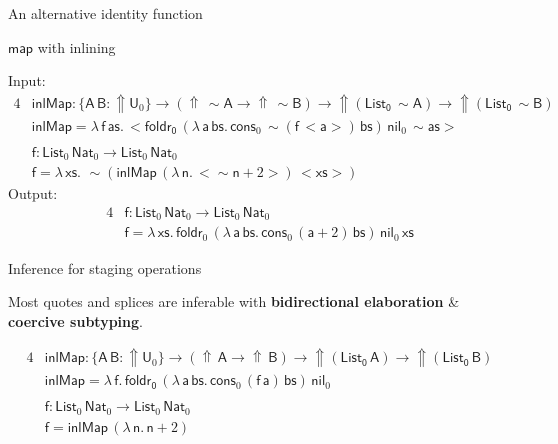 \documentclass[dvipsnames,aspectratio=169]{beamer}
\newcommand{\msf}[1]{\mathsf{#1}}
\newcommand{\Lift}{{\Uparrow}}
\newcommand{\spl}{{\sim}}
\newcommand{\qut}[1]{{<}#1{>}}
\newcommand{\U}{\msf{U}}
\newcommand{\List}{\msf{List}}
\newcommand{\nil}{\msf{nil}}
\newcommand{\cons}{\msf{cons}}
\newcommand{\Nat}{\msf{Nat}}
\theoremstyle{remark}
\newcommand{\msA}{\msf{A}}
\newcommand{\msB}{\msf{B}}
\newcommand{\msas}{\msf{as}}
\newcommand{\msbs}{\msf{bs}}
\newcommand{\msxs}{\msf{xs}}
\newcommand{\msff}{\msf{f}}
\newcommand{\msa}{\msf{a}}
\begin{document}
\begin{frame}{An alternative identity function}
\end{frame}


\begin{frame}{$\msf{map}$ with inlining}

Input:
\begin{alignat*}{4}
  & \msf{inlMap} : \{\msA\,\msB : \Lift \U_0\} \to (\Lift\,\spl\msA \to \Lift\,\spl\msB) \to \Lift(\msf{List_0}\,\spl\msA) \to \Lift(\msf{List_0}\,\spl\msB) \\
  & \msf{inlMap} = \lambda\,\msff\,\msas.\,\qut{\msf{foldr_0}\,
    (\lambda\,\msa\,\msbs.\,\cons_0\,\spl(\msff\,\qut{\msa})\,\msbs)\,
    \nil_0\,
    \spl{\msas}
    }\\
  & \\
  & \msf{f} : \List_0\,\Nat_0 \to \List_0\,\Nat_0\\
  & \msf{f} = \lambda\,\msxs.\,\,\spl(\msf{inlMap}\,(\lambda\,\msf{n}.\,\qut{\spl\msf{n} + 2})
     \,\qut{\msxs})
\end{alignat*}
\pause
Output:
\begin{alignat*}{4}
  & \msf{f} : \List_0\,\Nat_0 \to \List_0\,\Nat_0\\
  & \msf{f} = \lambda\,\msxs.\, \msf{foldr}_0\,(\lambda\,\msa\,\msbs.\,\cons_0\,(\msa + 2)\,\msbs)\,\nil_0\,\msxs
\end{alignat*}

\end{frame}

\begin{frame}{Inference for staging operations}

Most quotes and splices are inferable with \textbf{bidirectional elaboration} \& \textbf{coercive subtyping}.
\pause

\begin{alignat*}{4}
  & \msf{inlMap} : \{\msA\,\msB : \Lift \U_0\} \to (\Lift\,\msA \to \Lift\,\msB) \to \Lift(\msf{List_0}\,\msA) \to \Lift(\msf{List_0}\,\msB) \\
  & \msf{inlMap} = \lambda\,\msff.\,\msf{foldr_0}\,
    (\lambda\,\msa\,\msbs.\,\cons_0\,(\msff\,\msa)\,\msbs)\,
    \nil_0
    \\
  & \\
  & \msf{f} : \List_0\,\Nat_0 \to \List_0\,\Nat_0\\
  & \msf{f} = \msf{inlMap}\,(\lambda\,\msf{n}.\,\msf{n} + 2)
\end{alignat*}



\end{frame}
\end{document}
